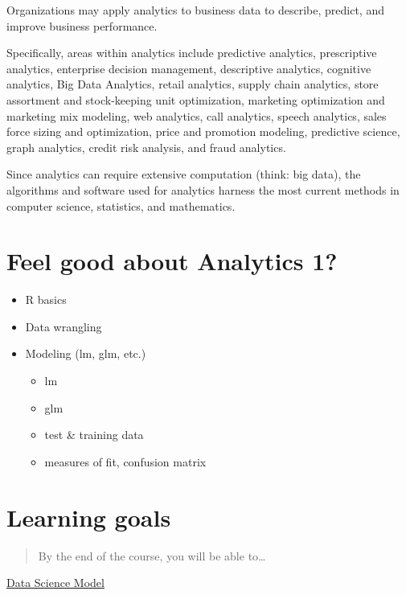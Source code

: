 \documentclass[
]{book}
\providecommand{\tightlist}{%
  \setlength{\itemsep}{0pt}\setlength{\parskip}{0pt}}
\theoremstyle{definition}
\theoremstyle{definition}
\theoremstyle{definition}
\theoremstyle{definition}
\theoremstyle{remark}
\begin{document}
Organizations may apply analytics to business data to describe, predict, and improve business performance.

Specifically, areas within analytics include predictive analytics, prescriptive analytics, enterprise decision management, descriptive analytics, cognitive analytics, Big Data Analytics, retail analytics, supply chain analytics, store assortment and stock-keeping unit optimization, marketing optimization and marketing mix modeling, web analytics, call analytics, speech analytics, sales force sizing and optimization, price and promotion modeling, predictive science, graph analytics, credit risk analysis, and fraud analytics.

Since analytics can require extensive computation (think: big data), the algorithms and software used for analytics harness the most current methods in computer science, statistics, and mathematics.

\hypertarget{feel-good-about-analytics-1}{%
\section{Feel good about Analytics 1?}\label{feel-good-about-analytics-1}}

\begin{itemize}
\tightlist
\item
  R basics
\item
  Data wrangling
\item
  Modeling (lm, glm, etc.)

  \begin{itemize}
  \tightlist
  \item
    lm
  \item
    glm
  \item
    test \& training data
  \item
    measures of fit, confusion matrix
  \end{itemize}
\end{itemize}

\hypertarget{learning-goals}{%
\section{Learning goals}\label{learning-goals}}

\begin{quote}
By the end of the course, you will be able to\ldots{}
\end{quote}

\href{https://d33wubrfki0l68.cloudfront.net/571b056757d68e6df81a3e3853f54d3c76ad6efc/32d37/diagrams/data-science.png}{Data Science Model}
\end{document}
